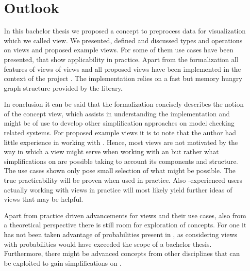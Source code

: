 \documentclass[preview]{standalone}
\begin{document}
\section{Outlook}

In this bachelor thesis we proposed a concept to preprocess data for visualization which we called view. We presented, defined and discussed types and operations on views and proposed example views. For some of them use cases have been presented, that show applicability in practice. Apart from the formalization all features of views of views and all proposed views have been implemented in the context of the project \pmcvis. The implementation relies on a fast but memory hungry graph structure provided by the \jgrapht library.

In conclusion it can be said that the formalization concisely describes the notion of the concept view, which assists in understanding the implementation and might be of use to develop other simplification approaches on model checking related systems. For proposed example views it is to note that the author had little experience in working with \mdpsN. Hence, most views are not motivated by the way in which a view might serve when working with an \mdpN but rather what simplifications on \mdpsN are possible taking to account its components and structure. The use cases shown only pose small selection of what might be possible. The true practicability will be proven when used in practice. Also \mdpN-experienced users actually working with views in practice will most likely yield further ideas of views that may be helpful.

Apart from practice driven advancements for views and their use cases, also from a theoretical perspective there is still room for exploration of concepts. For one it has not been taken advantage of probabilities present in \mdpsN, as considering views with probabilities would have exceeded the scope of a bachelor thesis. Furthermore, there might be advanced concepts from other disciplines that can be exploited to gain simplifications on \mdpsN.
\end{document}
